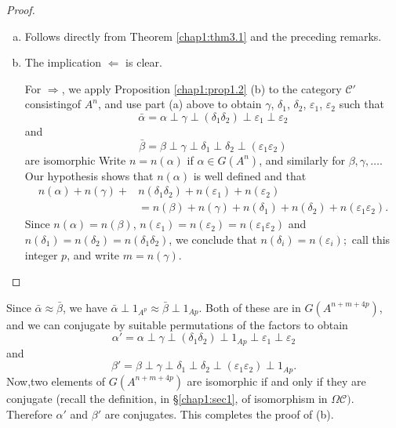 \begin{proof}
\begin{enumerate}[(a)]
\item Follows directly from Theorem \ref{chap1:thm3.1} and the
  preceding remarks. 

\item The implication $\Leftarrow$ is clear.

For $\Rightarrow$, we apply Proposition \ref{chap1:prop1.2} (b) to the category
$\mathscr{C}'$ consisting\pageoriginale of $A^n$, and use part (a)
above to obtain 
$\gamma$, $\delta_1$, $\delta_2$, $\varepsilon_1$, $\varepsilon_2$
such that  
$$
\bar{\alpha} = \alpha \perp \gamma \perp (\delta_1 \delta_2) \perp
\varepsilon_1 \perp \varepsilon_2 
$$
and 
$$
\bar{\beta} = \beta \perp \gamma \perp \delta_1 \perp \delta_2 \perp
(\varepsilon_1 \varepsilon_2) 
$$
are isomorphic Write $n= n (\alpha)$ if $\alpha \in G(A^n)$, and
similarly for $\beta, \gamma, \ldots$. Our hypothesis shows that
$n(\alpha)$ is well defined and that  
\begin{align*}
n(\alpha) + n(\gamma) + & n(\delta_1 \delta_2) + n (\varepsilon_1) + n
(\varepsilon_2)\\ 
& = n(\beta) + n(\gamma) + n(\delta_1) + n (\delta_2) + n
(\varepsilon_1 \varepsilon_2). 
\end{align*}
Since $n(\alpha) = n (\beta)$, $n (\varepsilon_1) = n(\varepsilon_2) =
n(\varepsilon_1 \varepsilon_2)$ and $n(\delta_1) = n(\delta_2)=
n(\delta_1 \delta_2)$, we conclude that $n(\delta_i) = n
(\varepsilon_i);$ call this integer $p$, and write $m = n(\gamma)$. 
\end{enumerate}
\end{proof}

Since $\bar{\alpha} \approx \bar{\beta}$, we have $\bar{\alpha} \perp
1_{A^p} \approx \bar{\beta} \perp 1_{Ap}$. Both of these are in
$G(A^{n + m + 4p})$, and we can conjugate by suitable permutations of
the factors to obtain  
$$
\alpha' = \alpha \perp \gamma \perp (\delta_1 \delta_2) \perp 1_{Ap}
\perp \varepsilon_1 \perp \varepsilon_2 
$$
and
$$
\beta' = \beta \perp \gamma \perp \delta_1 \perp \delta_2 \perp
(\varepsilon_1 \varepsilon_2) \perp 1_{Ap}. 
$$
Now,\pageoriginale two elements of $G(A^{n+ m + 4p})$ are isomorphic
if and only if 
they are conjugate (recall the definition, in \S \ref{chap1:sec1}, of
isomorphism 
in $\Omega \mathscr{C})$. Therefore $\alpha'$ and $\beta'$ are
conjugates. This completes the proof of (b). 

